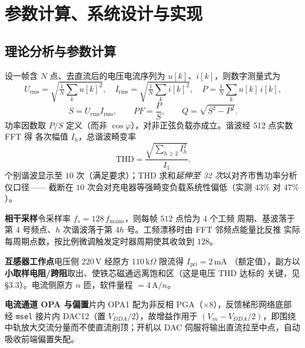 \documentclass[12pt]{article}
\begin{document}
\section{参数计算、系统设计与实现}
\subsection{理论分析与参数计算}
设一帧含 $N$ 点、去直流后的电压电流序列为 $u[k]$、$i[k]$，则数字测量式为
\begin{equation}
  U_{\text{rms}}=\sqrt{\tfrac1N\textstyle\sum_k u[k]^2},\quad
  I_{\text{rms}}=\sqrt{\tfrac1N\textstyle\sum_k i[k]^2},\quad
  P=\tfrac1N\textstyle\sum_k u[k]\,i[k],
\end{equation}
\begin{equation}
  S=U_{\text{rms}}I_{\text{rms}},\qquad
  PF=\frac{P}{S},\qquad
  Q=\sqrt{S^2-P^2}.
\end{equation}
功率因数取 $P/S$ 定义（而非 $\cos\varphi$），对非正弦负载亦成立。谐波经 512 点实数 FFT 得
各次幅值 $I_h$，总谐波畸变率
\begin{equation}
  \text{THD}=\frac{\sqrt{\sum_{h\ge 2} I_h^{2}}}{I_1}.
\end{equation}
个别谐波显示至 $10$ 次（满足要求）；THD 求和\emph{延伸至 32 次}以对齐市售功率分析仪口径——
截断在 $10$ 次会对充电器等强畸变负载系统性偏低（实测 $43\%$ 对 $47\%$）。

\textbf{相干采样}\quad 令采样率 $f_s=128\,f_{\text{mains}}$，则每帧 $512$ 点恰为 $4$ 个工频
周期、基波落于第 $4$ 号频点、$h$ 次谐波落于第 $4h$ 号。工频漂移时由 FFT 邻频点能量比反推
实际每周期点数，按比例微调触发定时器周期使其收敛到 $128$。

\textbf{互感器工作点}\quad 电压侧 $220$\,V 经原方 $110$\,k$\Omega$ 限流得 $I_{\text{pri}}=2$\,mA
（额定值），副方以\textbf{小取样电阻/跨阻}取出、使铁芯磁通远离饱和区（这是电压 THD 达标的
关键，见 \S3.3）。电流侧原方 $n$ 匝，软件量程 $=4$\,A$/n$。

\textbf{电流通道 OPA 与偏置}\quad 片内 OPA1 配为非反相 PGA（$\times 8$），反馈梯形网络底部
经 \texttt{msel} 接片内 DAC12（置 $V_{DDA}/2$），故增益作用于 $(V_{in}-V_{DDA}/2)$，即围绕
中轨放大交流分量而不使直流削顶；开机以 DAC 伺服将输出直流拉至中点，自动吸收前端偏置失配。
\end{document}
